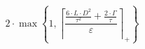 \[2 \cdot \max\left\{ 1, \left\lceil \frac{\frac{6 \cdot L \cdot D^{2}}{\tau^{2}} + \frac{2 \cdot \Gamma}{\tau}}{\varepsilon} \right\rceil_{+} \right\}\]
